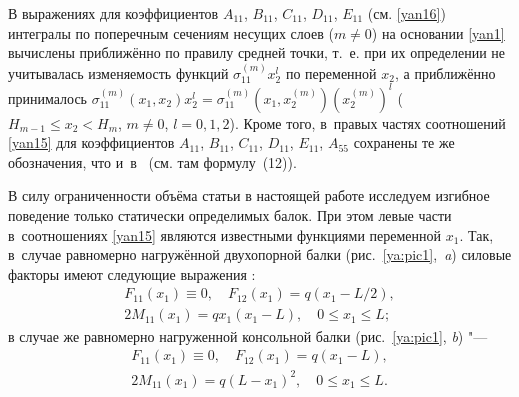В выражениях для коэффициентов $A_{11}$, $B_{11}$, $C_{11}$, $D_{11}$, $E_{11}$ (см. \eqref{yan16}) интегралы по поперечным сечениям несущих слоев ($m\ne0$) на основании \eqref{yan1} вычислены приближённо по правилу средней точки, т.~е. при их определении не учитывалась изменяемость функций $\sigma_{11}^{(m)}x_2^l$ по переменной $x_2$, а приближённо принималось $\sigma_{11}^{(m)}(x_1,x_2)x_2^l=\sigma_{11}^{(m)}(x_1,x_2^{(m)})(x_2^{(m)})^l$ ($H_{m-1}\le x_2<H_m$, $m\ne0$, $l=0, 1, 2$). 
Кроме того, в~правых частях соотношений \eqref{yan15} для коэффициентов $A_{11}$, $B_{11}$, $C_{11}$, $D_{11}$, $E_{11}$, $A_{55}$ сохранены те же обозначения, что и~в~\cite{yan:bib9} (см. там формулу~(12)).

В силу ограниченности объёма статьи в настоящей работе исследуем изгибное поведение только статически определимых балок. 
При этом левые части в~соотношениях \eqref{yan15} являются известными функциями переменной $x_1$. 
Так, в~случае равномерно нагружённой двухопорной балки (рис.~\ref{ya:pic1},~{\sl a}) силовые факторы 
имеют следующие выражения \cite{yan:bib8, yan:bib9}:
\begin{equation}
\label{yan17}
\begin{array}{l}
F_{11}(x_1)\equiv0,\quad  F_{12}(x_1)=q(x_1-L/2),\\
 2M_{11}(x_1)=qx_1(x_1-L),\quad  0\le x_1\le L;
\end{array}
\end{equation}
в случае же равномерно нагруженной консольной балки (рис.~\ref{ya:pic1}, {\sl b}) "---
\begin{equation}
\label{yan18}
\begin{array}{l}
F_{11}(x_1)\equiv0,\quad  F_{12}(x_1)=q(x_1-L),\\
2 M_{11}(x_1)=q(L-x_1)^2,\quad  0\le x_1\le L.
\end{array}
\end{equation}

